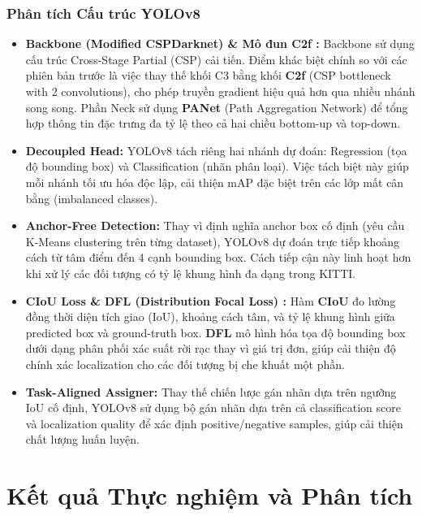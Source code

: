 \documentclass[a4paper]{article}
\theoremstyle{definition}
\begin{document}
\subsubsection*{Phân tích Cấu trúc YOLOv8}
\begin{itemize}
	\item \textbf{Backbone (Modified CSPDarknet) \& Mô đun C2f \cite{cspnet}:} Backbone sử dụng cấu trúc Cross-Stage Partial (CSP) cải tiến. Điểm khác biệt chính so với các phiên bản trước là việc thay thế khối C3 bằng khối \textbf{C2f} (CSP bottleneck with 2 convolutions), cho phép truyền gradient hiệu quả hơn qua nhiều nhánh song song. Phần Neck sử dụng \textbf{PANet} (Path Aggregation Network) \cite{panet} để tổng hợp thông tin đặc trưng đa tỷ lệ theo cả hai chiều bottom-up và top-down.
	\item \textbf{Decoupled Head:} YOLOv8 tách riêng hai nhánh dự đoán: Regression (tọa độ bounding box) và Classification (nhãn phân loại). Việc tách biệt này giúp mỗi nhánh tối ưu hóa độc lập, cải thiện mAP đặc biệt trên các lớp mất cân bằng (imbalanced classes).
	\item \textbf{Anchor-Free Detection:} Thay vì định nghĩa anchor box cố định (yêu cầu K-Means clustering trên từng dataset), YOLOv8 dự đoán trực tiếp khoảng cách từ tâm điểm đến 4 cạnh bounding box. Cách tiếp cận này linh hoạt hơn khi xử lý các đối tượng có tỷ lệ khung hình đa dạng trong KITTI.
	\item \textbf{CIoU Loss \& DFL (Distribution Focal Loss) \cite{ciou}:} Hàm \textbf{CIoU} đo lường đồng thời diện tích giao (IoU), khoảng cách tâm, và tỷ lệ khung hình giữa predicted box và ground-truth box. \textbf{DFL} mô hình hóa tọa độ bounding box dưới dạng phân phối xác suất rời rạc thay vì giá trị đơn, giúp cải thiện độ chính xác localization cho các đối tượng bị che khuất một phần.
	\item \textbf{Task-Aligned Assigner:} Thay thế chiến lược gán nhãn dựa trên ngưỡng IoU cố định, YOLOv8 sử dụng bộ gán nhãn dựa trên cả classification score và localization quality để xác định positive/negative samples, giúp cải thiện chất lượng huấn luyện.
\end{itemize}



\section{Kết quả Thực nghiệm và Phân tích}
\end{document}

